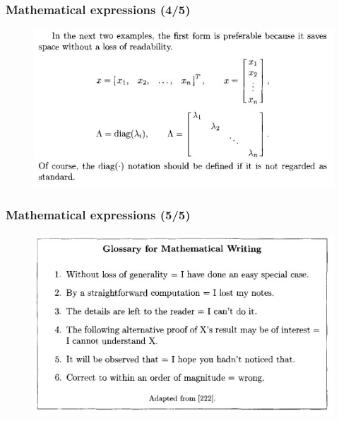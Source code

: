 \documentclass{beamer}
\begin{document}
\begin{frame}
\frametitle{Mathematical expressions (4/5)}
\begin{figure}[t]
 \includegraphics[width=\textwidth]{images/space.jpeg}
\end{figure}
\end{frame}
\begin{frame}
\frametitle{Mathematical expressions (5/5)}
\begin{figure}[t]
 \includegraphics[width=\textwidth]{images/math.jpeg}
\end{figure}
\end{frame}
\end{document}
